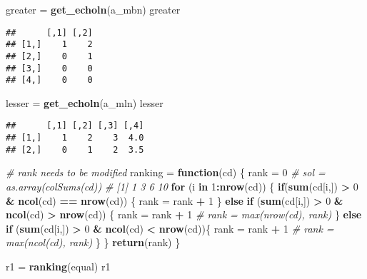 \documentclass[]{article}
\newenvironment{Shaded}{\begin{snugshade}}{\end{snugshade}}
\newcommand{\CommentTok}[1]{\textcolor[rgb]{0.56,0.35,0.01}{\textit{#1}}}
\newcommand{\ControlFlowTok}[1]{\textcolor[rgb]{0.13,0.29,0.53}{\textbf{#1}}}
\newcommand{\DecValTok}[1]{\textcolor[rgb]{0.00,0.00,0.81}{#1}}
\newcommand{\KeywordTok}[1]{\textcolor[rgb]{0.13,0.29,0.53}{\textbf{#1}}}
\newcommand{\NormalTok}[1]{#1}
\newcommand{\OperatorTok}[1]{\textcolor[rgb]{0.81,0.36,0.00}{\textbf{#1}}}
\newcommand{\StringTok}[1]{\textcolor[rgb]{0.31,0.60,0.02}{#1}}
\begin{document}
\begin{Shaded}
\begin{Highlighting}[]
\NormalTok{greater =}\StringTok{ }\KeywordTok{get_echoln}\NormalTok{(a_mbn)}
\NormalTok{greater}
\end{Highlighting}
\end{Shaded}

\begin{verbatim}
##      [,1] [,2]
## [1,]    1    2
## [2,]    0    1
## [3,]    0    0
## [4,]    0    0
\end{verbatim}

\begin{Shaded}
\begin{Highlighting}[]
\NormalTok{lesser =}\StringTok{ }\KeywordTok{get_echoln}\NormalTok{(a_mln)}
\NormalTok{lesser}
\end{Highlighting}
\end{Shaded}

\begin{verbatim}
##      [,1] [,2] [,3] [,4]
## [1,]    1    2    3  4.0
## [2,]    0    1    2  3.5
\end{verbatim}

\begin{Shaded}
\begin{Highlighting}[]
\CommentTok{# rank needs to be modified}
\NormalTok{ranking =}\StringTok{ }\ControlFlowTok{function}\NormalTok{(cd) \{}
\NormalTok{  rank =}\StringTok{ }\DecValTok{0}
  \CommentTok{# sol = as.array(colSums(cd))}
  \CommentTok{# [1]  1  3  6 10}
  \ControlFlowTok{for}\NormalTok{ (i }\ControlFlowTok{in} \DecValTok{1}\OperatorTok{:}\KeywordTok{nrow}\NormalTok{(cd)) \{}
    \ControlFlowTok{if}\NormalTok{(}\KeywordTok{sum}\NormalTok{(cd[i,]) }\OperatorTok{>}\StringTok{ }\DecValTok{0} \OperatorTok{&}\StringTok{ }\KeywordTok{ncol}\NormalTok{(cd) }\OperatorTok{==}\StringTok{ }\KeywordTok{nrow}\NormalTok{(cd)) \{}
\NormalTok{      rank =}\StringTok{ }\NormalTok{rank }\OperatorTok{+}\StringTok{ }\DecValTok{1}
\NormalTok{    \} }\ControlFlowTok{else} \ControlFlowTok{if}\NormalTok{ (}\KeywordTok{sum}\NormalTok{(cd[i,]) }\OperatorTok{>}\StringTok{ }\DecValTok{0} \OperatorTok{&}\StringTok{ }\KeywordTok{ncol}\NormalTok{(cd) }\OperatorTok{>}\StringTok{ }\KeywordTok{nrow}\NormalTok{(cd)) \{}
\NormalTok{      rank =}\StringTok{ }\NormalTok{rank }\OperatorTok{+}\StringTok{ }\DecValTok{1}
      \CommentTok{# rank = max(nrow(cd), rank)}
\NormalTok{    \} }\ControlFlowTok{else} \ControlFlowTok{if}\NormalTok{ (}\KeywordTok{sum}\NormalTok{(cd[i,]) }\OperatorTok{>}\StringTok{ }\DecValTok{0} \OperatorTok{&}\StringTok{ }\KeywordTok{ncol}\NormalTok{(cd) }\OperatorTok{<}\StringTok{ }\KeywordTok{nrow}\NormalTok{(cd))\{}
\NormalTok{      rank =}\StringTok{ }\NormalTok{rank }\OperatorTok{+}\StringTok{ }\DecValTok{1}
      \CommentTok{# rank = max(ncol(cd), rank)    }
\NormalTok{    \}}
\NormalTok{  \}}
  \KeywordTok{return}\NormalTok{(rank)}
\NormalTok{\}}

\NormalTok{r1 =}\StringTok{ }\KeywordTok{ranking}\NormalTok{(equal)}
\NormalTok{r1}
\end{Highlighting}
\end{Shaded}
\end{document}
